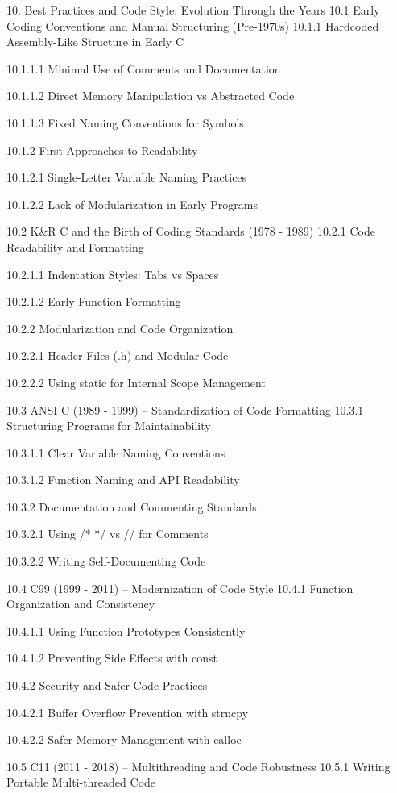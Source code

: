 10. Best Practices and Code Style: Evolution Through the Years
10.1 Early Coding Conventions and Manual Structuring (Pre-1970s)
10.1.1 Hardcoded Assembly-Like Structure in Early C

10.1.1.1 Minimal Use of Comments and Documentation

10.1.1.2 Direct Memory Manipulation vs Abstracted Code

10.1.1.3 Fixed Naming Conventions for Symbols

10.1.2 First Approaches to Readability

10.1.2.1 Single-Letter Variable Naming Practices

10.1.2.2 Lack of Modularization in Early Programs

10.2 K&R C and the Birth of Coding Standards (1978 - 1989)
10.2.1 Code Readability and Formatting

10.2.1.1 Indentation Styles: Tabs vs Spaces

10.2.1.2 Early Function Formatting

10.2.2 Modularization and Code Organization

10.2.2.1 Header Files (.h) and Modular Code

10.2.2.2 Using static for Internal Scope Management

10.3 ANSI C (1989 - 1999) – Standardization of Code Formatting
10.3.1 Structuring Programs for Maintainability

10.3.1.1 Clear Variable Naming Conventions

10.3.1.2 Function Naming and API Readability

10.3.2 Documentation and Commenting Standards

10.3.2.1 Using /* */ vs // for Comments

10.3.2.2 Writing Self-Documenting Code

10.4 C99 (1999 - 2011) – Modernization of Code Style
10.4.1 Function Organization and Consistency

10.4.1.1 Using Function Prototypes Consistently

10.4.1.2 Preventing Side Effects with const

10.4.2 Security and Safer Code Practices

10.4.2.1 Buffer Overflow Prevention with strncpy

10.4.2.2 Safer Memory Management with calloc

10.5 C11 (2011 - 2018) – Multithreading and Code Robustness
10.5.1 Writing Portable Multi-threaded Code

